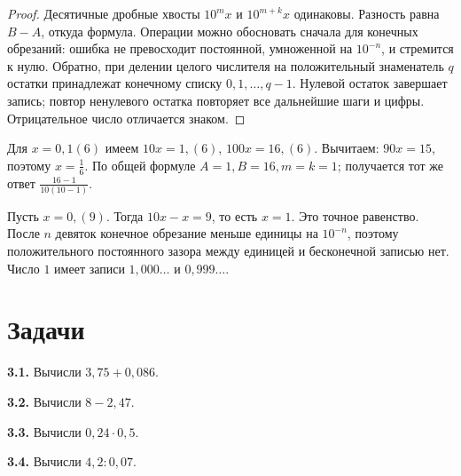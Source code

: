 \begin{proof}Десятичные дробные хвосты \(10^m x\) и \(10^{m+k}x\) одинаковы. Разность равна \(B-A\), откуда формула. Операции можно обосновать сначала для конечных обрезаний: ошибка не превосходит постоянной, умноженной на \(10^{-n}\), и стремится к нулю. Обратно, при делении целого числителя на положительный знаменатель \(q\) остатки принадлежат конечному списку \(0,1,\ldots,q-1\). Нулевой остаток завершает запись; повтор ненулевого остатка повторяет все дальнейшие шаги и цифры. Отрицательное число отличается знаком.\end{proof}
\begin{example}Для \(x=0{,}1(6)\) имеем \(10x=1{,}(6)\), \(100x=16{,}(6)\). Вычитаем: \(90x=15\), поэтому \(x=\frac16\). По общей формуле \(A=1,B=16,m=k=1\); получается тот же ответ \(\frac{16-1}{10(10-1)}\).\end{example}
\begin{example}Пусть \(x=0{,}(9)\). Тогда \(10x-x=9\), то есть \(x=1\). Это точное равенство. После \(n\) девяток конечное обрезание меньше единицы на \(10^{-n}\), поэтому положительного постоянного зазора между единицей и бесконечной записью нет. Число \(1\) имеет записи \(1{,}000\ldots\) и \(0{,}999\ldots\).\end{example}
\section*{Задачи}
\begingroup\setlength{\parskip}{2pt}
\noindent\begin{minipage}[t]{\linewidth}\textbf{3.1.} Вычисли \(3{,}75 + 0{,}086\).\par\end{minipage}\par
\noindent\begin{minipage}[t]{\linewidth}\textbf{3.2.} Вычисли \(8 - 2{,}47\).\par\end{minipage}\par
\noindent\begin{minipage}[t]{\linewidth}\textbf{3.3.} Вычисли \(0{,}24 \cdot  0{,}5\).\par\end{minipage}\par
\noindent\begin{minipage}[t]{\linewidth}\textbf{3.4.} Вычисли \(4{,}2 : 0{,}07\).\par\end{minipage}\par
